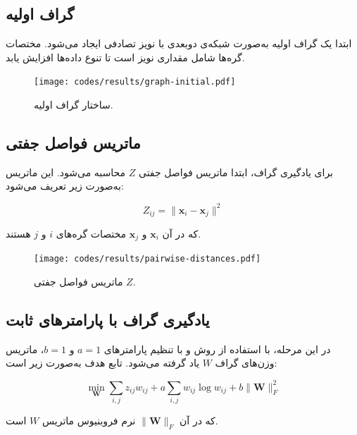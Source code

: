\documentclass[12pt,onecolumn,a4paper]{article}
\begin{document}
	\subsection{گراف اولیه}
	ابتدا یک گراف اولیه به‌صورت شبکه‌ی دوبعدی با نویز تصادفی ایجاد می‌شود. مختصات گره‌ها شامل مقداری نویز است تا تنوع داده‌ها افزایش یابد.
	
	\begin{latin}
		
	\end{latin}
	
	\begin{figure}[H]
		\centering
		\texttt{[image: codes/results/graph-initial.pdf]}		\caption{ساختار گراف اولیه.}
		\label{fig:graph-initial}
	\end{figure}
	
	\subsection{ماتریس فواصل جفتی}
	برای یادگیری گراف، ابتدا ماتریس فواصل جفتی \( Z \) محاسبه می‌شود. این ماتریس به‌صورت زیر تعریف می‌شود:
	
	\[
	Z_{ij} = \|\mathbf{x}_i - \mathbf{x}_j\|^2
	\]
	
	که در آن \( \mathbf{x}_i \) و \( \mathbf{x}_j \) مختصات گره‌های \( i \) و \( j \) هستند.
	
	\begin{latin}
		
	\end{latin}
	
	
	\begin{figure}[H]
		\centering
		\texttt{[image: codes/results/pairwise-distances.pdf]}
		\caption{ماتریس فواصل جفتی \( Z \).}
		\label{fig:pairwise-distances}
	\end{figure}
	
	\subsection{یادگیری گراف با پارامترهای ثابت}
	در این مرحله، با استفاده از روش \cite{Kalofolias2016} و با تنظیم پارامترهای \( a = 1 \) و \( b = 1 \)، ماتریس وزن‌های گراف \( W \) یاد گرفته می‌شود. تابع هدف به‌صورت زیر است:
	
	\[
	\min_{\bm{W}} \sum_{i,j} z_{ij} w_{ij} + a \sum_{i,j} {w}_{ij} \log {w}_{ij} + b \|\bm{W}\|_F^2
	\]
	
	که در آن
	 \( \|\bm{W}\|_F \)
	 نرم فروبنیوس ماتریس \( W \) است.
	
\end{document}
